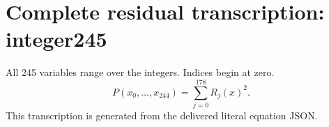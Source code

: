 \documentclass[10pt]{article}
\begin{document}
\section*{Complete residual transcription: integer245}
All 245 variables range over the integers. Indices begin at zero.
\[P(x_0,\ldots,x_{244})=\sum_{j=0}^{178}R_j(x)^2.\]
This transcription is generated from the delivered literal equation JSON.

\end{document}
